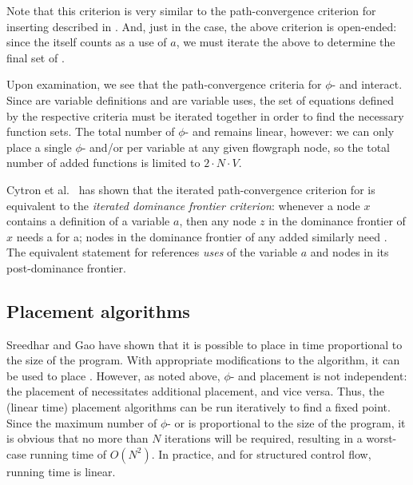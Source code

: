 Note that this criterion is very similar to the path-con\-ver\-gence
criterion for inserting  described in
\cite{appel:modern,cytron91:ssa}.  And, just in the \phifunction{}
case, the above criterion is open-ended: since the \sigfunction{}
itself counts as a use of $a$, we must iterate the above to determine
the final set of .

Upon examination, we see that the path-con\-ver\-gence criteria for $\phi$- and
 interact.  Since  are variable
definitions and  are variable uses, the set of
equations defined by the respective criteria must be iterated together 
in order to find the necessary function sets.  The total number of
$\phi$- and  remains linear, however: we can only place 
a single $\phi$- and/or \sigfunction{} per variable at any given
flowgraph node, so the total number of added functions is limited to 
$2 \cdot N \cdot V$.

Cytron et al.\ \cite{cytron91:ssa} has shown that the iterated
path-con\-ver\-gence criterion for  is equivalent to the
\textit{iterated dominance frontier criterion}: whenever a node $x$
contains a definition of a variable $a$, then any node $z$ in the
dominance frontier of $x$ needs a \phifunction{} for a; nodes in the
dominance frontier of any added \phifunction{} similarly need
.  The equivalent statement for 
references \textit{uses} of the variable $a$ and nodes in its
post-dominance frontier. 

\subsection{Placement algorithms}
Sreedhar and Gao have shown \cite{sreedhar95:lintime} that it is
possible to place  in time proportional to the size of
the program.  With appropriate modifications to the algorithm, it can
be used to place .  However, as noted above, $\phi$-
and \sigfunction{} placement is not independent: the placement of
 necessitates additional \sigfunction{} placement, and
vice versa.  Thus, the (linear time) placement algorithms can be run
iteratively to find a fixed point.  Since the maximum number of
$\phi$- or  is proportional to the size of the program,
it is obvious that no more than $N$ iterations will be required,
resulting in a worst-case running time of $O(N^2)$.  In practice, and
for structured control flow, running time is linear.
